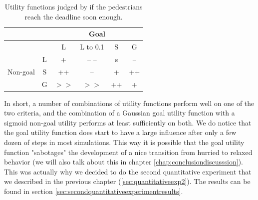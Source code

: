 \documentclass[11pt, a4paper]{book}
\begin{document}
\begin{table}[h!]
\centering
\begin{tabular}{|c|c|c|c|c|c|}
\hline
 &  & \multicolumn{4}{c|}{Goal} \\ 
\hline 
 &  & L & L to 0.1 & S & G \\ 
\hline 
\multirow{3}{*}{Non-goal} & L & + & -- -- & s & -- \\ 
 & S & ++ & -- & + & ++ \\ 
 & G & $>>$ & $>>$ & ++ & + \\ 
\hline 
\end{tabular} 
\caption{Utility functions judged by if the pedestrians reach the deadline soon enough.}
\label{tab:judgegoaldeadline}
\end{table}


%

In short, a number of combinations of utility functions perform well on one of the two criteria, and the combination of a Gaussian goal utility function with a sigmoid non-goal utility performs at least sufficiently on both. We do notice that the goal utility function does start to have a large influence after only a few dozen of steps in most simulations. This way it is possible that the goal utility function "sabotages" the development of a nice transition from hurried to relaxed behavior (we will also talk about this in chapter \ref{chap:conclusiondiscusssion}). This was actually why we decided to do the second quantitative experiment that we described in the previous chapter (\ref{sec:quantitativeexp2}). The results can be found in section \ref{sec:secondquantitativeexperimentresults}.


\end{document}
